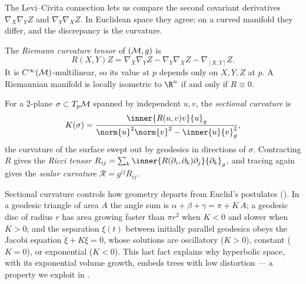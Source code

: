 The Levi--Civita connection lets us compare the second covariant derivatives
$\nabla_X \nabla_Y Z$ and $\nabla_Y \nabla_X Z$. In Euclidean space they agree;
on a curved manifold they differ, and the discrepancy is the curvature.

\begin{definition}
\label{def:geo:riemann}
The \emph{Riemann curvature tensor} of $(\mathcal{M}, g)$ is
\[
  R(X,Y)Z = \nabla_X \nabla_Y Z - \nabla_Y \nabla_X Z - \nabla_{[X,Y]} Z .
\]
It is $C^\infty(\mathcal{M})$-multilinear, so its value at $p$ depends only on $X, Y, Z$
at $p$. A Riemannian manifold is locally isometric to $\R^n$ if and only if
$R \equiv 0$.
\end{definition}

\begin{definition}
\label{def:geo:sectional}
For a $2$-plane $\sigma \subset T_p\mathcal{M}$ spanned by independent $u, v$, the
\emph{sectional curvature} is
\[
  K(\sigma) = \frac{\inner{R(u,v)v}{u}_g}{\norm{u}^2\norm{v}^2 - \inner{u}{v}_g^2},
\]
the curvature of the surface swept out by geodesics in directions of $\sigma$.
Contracting $R$ gives the \emph{Ricci tensor}
$R_{ij} = \sum_k \inner{R(\partial_i,\partial_k)\partial_j}{\partial_k}_g$, and
tracing again gives the \emph{scalar curvature} $\mathcal{R} = g^{ij}R_{ij}$.
\end{definition}

Sectional curvature controls how geometry departs from Euclid's postulates
(). In a geodesic triangle of area $A$ the angle sum is
$\alpha + \beta + \gamma = \pi + K\,A$; a geodesic disc of radius $r$ has area
growing faster than $\pi r^2$ when $K < 0$ and slower when $K > 0$; and the
separation $\xi(t)$ between initially parallel geodesics obeys the Jacobi
equation $\ddot\xi + K\xi = 0$, whose solutions are oscillatory ($K > 0$),
constant ($K = 0$), or exponential ($K < 0$). This last fact explains why
hyperbolic space, with its exponential volume growth, embeds trees with low
distortion --- a property we exploit in .

